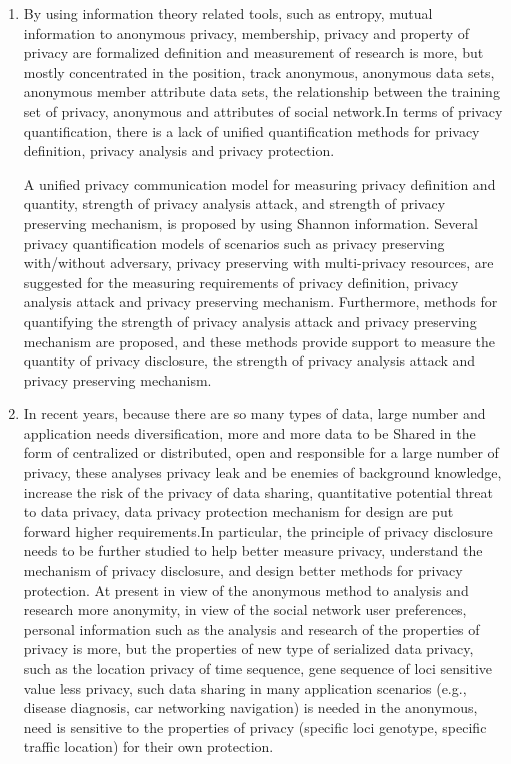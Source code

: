 \documentclass[pdftex,notypeinfo,twoside,openany,UTF8,fntef]{CASthesis}
\theoremstyle{THrm}{
	\newtheorem{question}{Question}[section]
	\newtheorem{property}{性质}[section]
	\newtheorem{assumption}{假设}[section]
	\newtheorem{claim}[lemma]{断言}
	
}
\begin{document}
\begin{enumerate}
	\item
	By using information theory related tools, such as entropy, mutual information to anonymous privacy, membership, privacy and property of privacy are formalized definition and measurement of research is more, but mostly concentrated in the position, track anonymous, anonymous data sets, anonymous member attribute data sets, the relationship between the training set of privacy, anonymous and attributes of social network.In terms of privacy quantification, there is a lack of unified quantification methods for privacy definition, privacy analysis and privacy protection.
		
	A unified privacy communication model for measuring privacy definition and quantity, strength of privacy analysis attack, and strength of privacy preserving mechanism, is proposed by using Shannon information.
	Several privacy quantification models of scenarios such as privacy preserving with/without adversary, privacy preserving with multi-privacy resources, are suggested for the measuring requirements of privacy definition, privacy analysis attack and privacy preserving mechanism. Furthermore, methods for quantifying the strength of  privacy analysis attack and privacy preserving mechanism are proposed, and these methods provide support to measure the quantity of privacy disclosure, the strength of  privacy analysis attack and privacy preserving mechanism.%
	
	\item
	In recent years, because there are so many types of data, large number and application needs diversification, more and more data to be Shared in the form of centralized or distributed, open and responsible for a large number of privacy, these analyses privacy leak and be enemies of background knowledge, increase the risk of the privacy of data sharing, quantitative potential threat to data privacy, data privacy protection mechanism for design are put forward higher requirements.In particular, the principle of privacy disclosure needs to be further studied to help better measure privacy, understand the mechanism of privacy disclosure, and design better methods for privacy protection. At present in view of the anonymous method to analysis and research more anonymity, in view of the social network user preferences, personal information such as the analysis and research of the properties of privacy is more, but the properties of new type of serialized data privacy, such as the location privacy of time sequence, gene sequence of loci sensitive value less privacy, such data sharing in many application scenarios (e.g., disease diagnosis, car networking navigation) is needed in the anonymous, need is sensitive to the properties of privacy (specific loci genotype, specific traffic location) for their own protection.
		

\end{enumerate}
\end{document}
